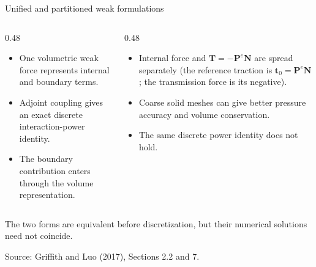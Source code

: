 \documentclass[aspectratio=169,11pt]{beamer}
\newcommand{\Pten}{\bm{P}^{e}}
\newcommand{\normal}{\bm{N}}
\begin{document}
\begin{frame}{Unified and partitioned weak formulations}
\begin{columns}[T,onlytextwidth]
\begin{column}{0.48\textwidth}
\begin{itemize}\itemsep6pt
  \item One volumetric weak force represents internal and boundary terms.
  \item Adjoint coupling gives an exact discrete interaction-power identity.
  \item The boundary contribution enters through the volume representation.
\end{itemize}
\end{column}
\begin{column}{0.48\textwidth}
\begin{itemize}\itemsep6pt
  \item Internal force and \(\bm{T}=-\Pten\normal\) are spread separately (the reference traction is \(\bm{t}_0=\Pten\normal\); the transmission force is its negative).
  \item Coarse solid meshes can give better pressure accuracy and volume conservation.
  \item The same discrete power identity does not hold.
\end{itemize}
\end{column}
\end{columns}

\medskip
\begin{punchbox}
The two forms are equivalent before discretization, but their numerical solutions need not coincide.
\end{punchbox}

\vfill
{\scriptsize Source: Griffith and Luo (2017), Sections 2.2 and 7.}
\end{frame}
\end{document}
